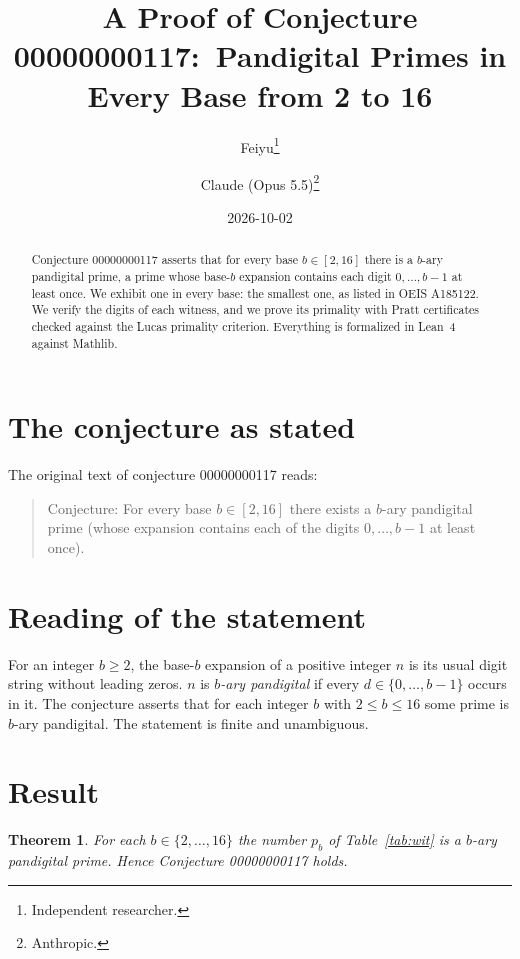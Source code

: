 \documentclass[11pt]{article}
\title{A Proof of Conjecture 00000000117:\
Pandigital Primes in Every Base from 2 to 16}
\author{%
  Feiyu\thanks{Independent researcher.}
  \and
  Claude (Opus 5.5)\thanks{Anthropic.}%
}
\date{2026-10-02}
\theoremstyle{plain}
\newtheorem{theorem}{Theorem}
\theoremstyle{definition}
\theoremstyle{remark}
\begin{document}
\maketitle

\begin{abstract}
Conjecture 00000000117 asserts that for every base $b\in[2,16]$ there is a
$b$-ary pandigital prime, a prime whose base-$b$ expansion contains each
digit $0,\ldots,b-1$ at least once. We exhibit one in every base: the smallest
one, as listed in OEIS A185122. We verify the digits of each witness, and we
prove its primality with Pratt certificates checked against the Lucas
primality criterion. Everything is formalized in Lean~4 against Mathlib.
\end{abstract}

\section{The conjecture as stated}

The original text of conjecture 00000000117 reads:

\begin{quote}
Conjecture: For every base $b \in [2, 16]$ there exists a $b$-ary pandigital
prime (whose expansion contains each of the digits $0, \ldots, b-1$ at least
once).
\end{quote}

\section{Reading of the statement}

For an integer $b\ge2$, the base-$b$ expansion of a positive integer $n$ is
its usual digit string without leading zeros. $n$ is \emph{$b$-ary
pandigital} if every $d\in\{0,\ldots,b-1\}$ occurs in it. The conjecture
asserts that for each integer $b$ with $2\le b\le16$ some prime is $b$-ary
pandigital. The statement is finite and unambiguous.

\section{Result}

\begin{theorem}\label{thm:main}
For each $b\in\{2,\ldots,16\}$ the number $p_b$ of Table~\ref{tab:wit} is a
$b$-ary pandigital prime. Hence Conjecture 00000000117 holds.
\end{theorem}
\end{document}
